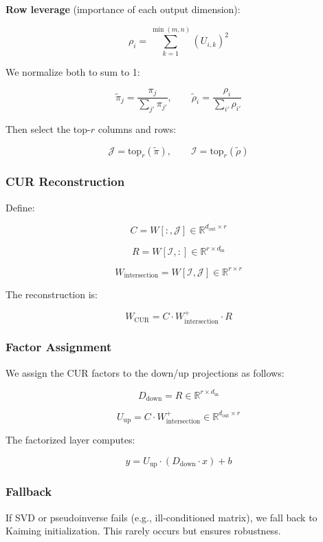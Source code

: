 \textbf{Row leverage} (importance of each output dimension):

\[
\rho_i = \sum_{k=1}^{\min(m, n)} (U_{i, k})^2
\tag{4.4}
\]

We normalize both to sum to 1:

\[
\tilde{\pi}_j = \frac{\pi_j}{\sum_{j'} \pi_{j'}}, \qquad
\tilde{\rho}_i = \frac{\rho_i}{\sum_{i'} \rho_{i'}}
\tag{4.5}
\]

Then select the top-$r$ columns and rows:

\[
\mathcal{J} = \text{top}_r(\tilde{\pi}), \qquad
\mathcal{I} = \text{top}_r(\tilde{\rho})
\tag{4.6}
\]

\subsubsection{CUR Reconstruction}

Define:

\[
C = W[:, \mathcal{J}] \in \mathbb{R}^{d_\text{out} \times r}
\tag{4.7}
\]

\[
R = W[\mathcal{I}, :] \in \mathbb{R}^{r \times d_\text{in}}
\tag{4.8}
\]

\[
W_\text{intersection} = W[\mathcal{I}, \mathcal{J}] \in \mathbb{R}^{r \times r}
\tag{4.9}
\]

The reconstruction is:

\[
W_\text{CUR} = C \cdot W_\text{intersection}^+ \cdot R
\tag{4.10}
\]

\subsubsection{Factor Assignment}

We assign the CUR factors to the down/up projections as follows:

\[
D_\text{down} = R \in \mathbb{R}^{r \times d_\text{in}}
\tag{4.11}
\]

\[
U_\text{up} = C \cdot W_\text{intersection}^+ \in \mathbb{R}^{d_\text{out} \times r}
\tag{4.12}
\]

The factorized layer computes:

\[
y = U_\text{up} \cdot (D_\text{down} \cdot x) + b
\tag{4.13}
\]

\subsubsection{Fallback}

If SVD or pseudoinverse fails (e.g., ill-conditioned matrix), we fall back 
to Kaiming initialization. This rarely occurs but ensures robustness.

